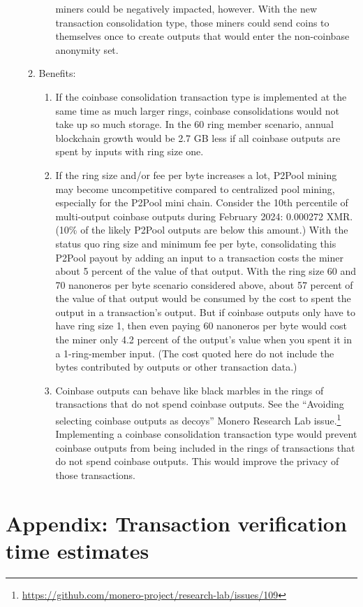 \documentclass[english]{article}
\begin{document}
\begin{enumerate}
\begin{enumerate}
\begin{enumerate}
miners could be negatively impacted, however. With the new transaction
consolidation type, those miners could send coins to themselves once
to create outputs that would enter the non-coinbase anonymity set. 
\end{enumerate}
\item Benefits:
\begin{enumerate}
\item If the coinbase consolidation transaction type is implemented at the
same time as much larger rings, coinbase consolidations would not
take up so much storage. In the 60 ring member scenario, annual blockchain
growth would be 2.7 GB less if all coinbase outputs are spent by inputs
with ring size one.
\item If the ring size and/or fee per byte increases a lot, P2Pool mining
may become uncompetitive compared to centralized pool mining, especially
for the P2Pool mini chain. Consider the 10th percentile of multi-output
coinbase outputs during February 2024: 0.000272 XMR. (10\% of the
likely P2Pool outputs are below this amount.) With the status quo
ring size and minimum fee per byte, consolidating this P2Pool payout
by adding an input to a transaction costs the miner about 5 percent
of the value of that output. With the ring size 60 and 70 nanoneros
per byte scenario considered above, about 57 percent of the value
of that output would be consumed by the cost to spent the output in
a transaction's output. But if coinbase outputs only have to have
ring size 1, then even paying 60 nanoneros per byte would cost the
miner only 4.2 percent of the output's value when you spent it in
a 1-ring-member input. (The cost quoted here do not include the bytes
contributed by outputs or other transaction data.)
\item Coinbase outputs can behave like black marbles in the rings of transactions
that do not spend coinbase outputs. See the ``Avoiding selecting
coinbase outputs as decoys'' Monero Research Lab issue.\footnote{\url{https://github.com/monero-project/research-lab/issues/109}}
Implementing a coinbase consolidation transaction type would prevent
coinbase outputs from being included in the rings of transactions
that do not spend coinbase outputs. This would improve the privacy
of those transactions.
\end{enumerate}
\end{enumerate}
\end{enumerate}

\appendix
\newpage{}

\section{Appendix: Transaction verification time estimates\label{sec:Appendix:-Transaction-verification}}
\end{document}
